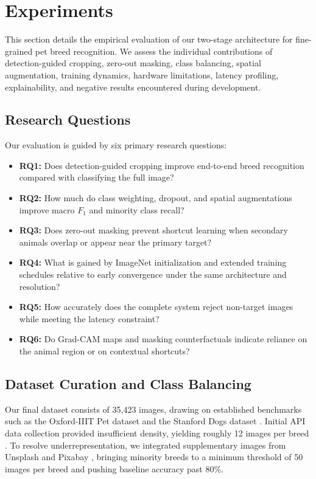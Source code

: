 \FloatBarrier
\section{Experiments}
\label{sec:experiments}

This section details the empirical evaluation of our two-stage architecture for fine-grained pet breed recognition. We assess the individual contributions of detection-guided cropping, zero-out masking, class balancing, spatial augmentation, training dynamics, hardware limitations, latency profiling, explainability, and negative results encountered during development.

\subsection{Research Questions}
\label{subsec:research_questions}

Our evaluation is guided by six primary research questions:
\begin{itemize}
    \item \textbf{RQ1:} Does detection-guided cropping improve end-to-end breed recognition compared with classifying the full image?
    \item \textbf{RQ2:} How much do class weighting, dropout, and spatial augmentations improve macro $F_1$ and minority class recall?
    \item \textbf{RQ3:} Does zero-out masking prevent shortcut learning when secondary animals overlap or appear near the primary target?
    \item \textbf{RQ4:} What is gained by ImageNet initialization and extended training schedules relative to early convergence under the same architecture and resolution?
    \item \textbf{RQ5:} How accurately does the complete system reject non-target images while meeting the latency constraint?
    \item \textbf{RQ6:} Do Grad-CAM maps and masking counterfactuals indicate reliance on the animal region or on contextual shortcuts?
\end{itemize}

\subsection{Dataset Curation and Class Balancing}
\label{subsec:dataset_curation}

Our final dataset consists of 35,423 images, drawing on established benchmarks such as the Oxford-IIIT Pet dataset \cite{parkhi2012catsdogs} and the Stanford Dogs dataset \cite{khosla2011novel}. Initial API data collection provided insufficient density, yielding roughly 12 images per breed \cite{cat_api, thedogapi}. To resolve underrepresentation, we integrated supplementary images from Unsplash \cite{unsplash} and Pixabay \cite{pixabay}, bringing minority breeds to a minimum threshold of 50 images per breed and pushing baseline accuracy past 80\%.

